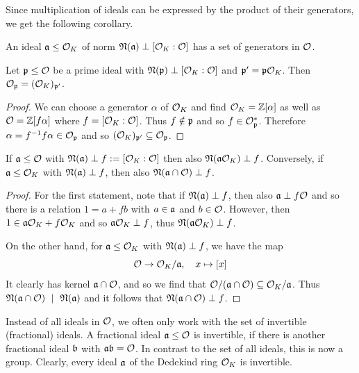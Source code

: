 Since multiplication of ideals can be expressed by the product of their generators, we get the following corollary.
\begin{corollary}
    \label{prop:generators_in_order}
    An ideal $\mathfrak{a} \leq \mathcal{O}_K$ of norm $\mathfrak{N}(\mathfrak{a}) \perp [\mathcal{O}_K : \mathcal{O}]$ has a set of generators in $\mathcal{O}$.
\end{corollary}
\begin{prop}
    \label{prop:prime_coprime_localization_same}
    Let $\mathfrak{p} \leq \mathcal{O}$ be a prime ideal with $\mathfrak{N}(\mathfrak{p}) \perp [\mathcal{O}_K : \mathcal{O}]$ and $\mathfrak{p}' = \mathfrak{p}\mathcal{O}_K$.
    Then $\mathcal{O}_{\mathfrak{p}} = (\mathcal{O}_K)_{\mathfrak{p}'}$.
\end{prop}
\begin{proof}
    We can choose a generator $\alpha$ of $\mathcal{O}_K$ and find $\mathcal{O}_K = \mathbb{Z}[\alpha]$ as well as $\mathcal{O} = \mathbb{Z}[f\alpha]$ where $f = [\mathcal{O}_K : \mathcal{O}]$.
    Thus $f \notin \mathfrak{p}$ and so $f \in \mathcal{O}_{\mathfrak{p}}^*$.
    Therefore $\alpha = f^{-1}f\alpha \in \mathcal{O}_{\mathfrak{p}}$ and so $(\mathcal{O}_K)_{\mathfrak{p}'} \subseteq \mathcal{O}_{\mathfrak{p}}$.
\end{proof}
\begin{lemma}
    If $\mathfrak{a} \leq \mathcal{O}$ with $\mathfrak{N}(\mathfrak{a}) \perp f := [\mathcal{O}_K : \mathcal{O}]$ then also $\mathfrak{N}(\mathfrak{a}\mathcal{O}_K) \perp f$.
    Conversely, if $\mathfrak{a} \leq \mathcal{O}_K$ with $\mathfrak{N}(\mathfrak{a}) \perp f$, then also $\mathfrak{N}(\mathfrak{a} \cap \mathcal{O}) \perp f$.
\end{lemma}
\begin{proof}
    For the first statement, note that if $\mathfrak{N}(\mathfrak{a}) \perp f$, then also $\mathfrak{a} \perp f\mathcal{O}$ and so there is a relation $1 = a + fb$ with $a \in \mathfrak{a}$ and $b \in \mathcal{O}$.
    However, then $1 \in \mathfrak{a}\mathcal{O}_K + f\mathcal{O}_K$ and so $\mathfrak{a}\mathcal{O}_K \perp f$, thus $\mathfrak{N}(\mathfrak{a}\mathcal{O}_K) \perp f$.

    On the other hand, for $\mathfrak{a} \leq \mathcal{O}_K$ with $\mathfrak{N}(\mathfrak{a}) \perp f$, we have the map
    \begin{equation*}
        \mathcal{O} \to \mathcal{O}_K/\mathfrak{a}, \quad x \mapsto [x]
    \end{equation*}
    It clearly has kernel $\mathfrak{a} \cap \mathcal{O}$, and so we find that $\mathcal{O}/(\mathfrak{a} \cap \mathcal{O}) \subseteq \mathcal{O}_K/\mathfrak{a}$.
    Thus $\mathfrak{N}(\mathfrak{a} \cap \mathcal{O}) \ \mid \  \mathfrak{N}(\mathfrak{a})$ and it follows that $\mathfrak{N}(\mathfrak{a} \cap \mathcal{O}) \perp f$.
\end{proof}
Instead of all ideals in $\mathcal{O}$, we often only work with the set of invertible (fractional) ideals.
A fractional ideal $\mathfrak{a} \leq \mathcal{O}$ is invertible, if there is another fractional ideal $\mathfrak{b}$ with $\mathfrak{a}\mathfrak{b} = \mathcal{O}$.
In contrast to the set of all ideals, this is now a group.
Clearly, every ideal $\mathfrak{a}$ of the Dedekind ring $\mathcal{O}_K$ is invertible.

